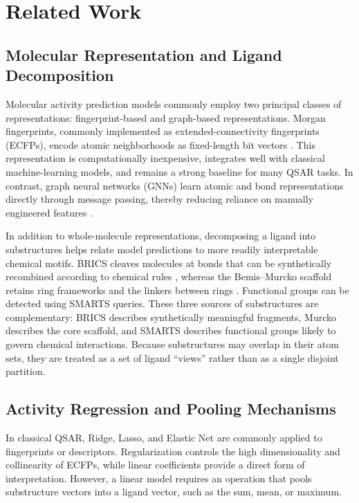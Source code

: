 \section{Related Work}
\label{sec:related_work}

\subsection{Molecular Representation and Ligand Decomposition}

Molecular activity prediction models commonly employ two principal classes of
representations: fingerprint-based and graph-based representations. Morgan
fingerprints, commonly implemented as extended-connectivity fingerprints
(ECFPs), encode atomic neighborhoods as fixed-length bit vectors
\cite{rogers2010extended}. This representation is computationally inexpensive,
integrates well with classical machine-learning models, and remains a strong
baseline for many QSAR tasks. In contrast, graph neural networks (GNNs) learn
atomic and bond representations directly through message passing, thereby
reducing reliance on manually engineered features \cite{gilmer2017neural}.

In addition to whole-molecule representations, decomposing a ligand into
substructures helps relate model predictions to more readily interpretable
chemical motifs. BRICS cleaves molecules at bonds that can be synthetically
recombined according to chemical rules \cite{degen2008art}, whereas the
Bemis--Murcko scaffold retains ring frameworks and the linkers between rings
\cite{bemis1996properties}. Functional groups can be detected using SMARTS
queries. These three sources of substructures are complementary: BRICS describes
synthetically meaningful fragments, Murcko describes the core scaffold, and
SMARTS describes functional groups likely to govern chemical interactions.
Because substructures may overlap in their atom sets, they are treated as a set
of ligand ``views'' rather than as a single disjoint partition.

\subsection{Activity Regression and Pooling Mechanisms}

In classical QSAR, Ridge, Lasso, and Elastic Net are commonly applied to
fingerprints or descriptors. Regularization controls the high dimensionality and
collinearity of ECFPs, while linear coefficients provide a direct form of
interpretation. However, a linear model requires an operation that pools
substructure vectors into a ligand vector, such as the sum, mean, or maximum.


